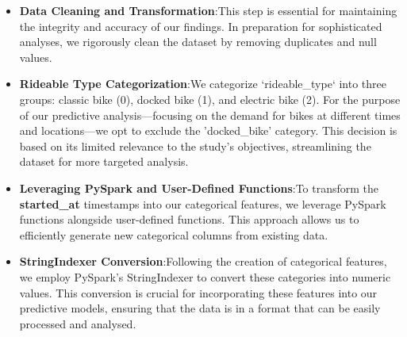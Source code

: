     \begin{itemize}
        \item \textbf{Data Cleaning and Transformation}:\newline This step is essential for maintaining the integrity and accuracy of our findings. In preparation for sophisticated analyses, we rigorously clean the dataset by removing duplicates and null values.
        \item \textbf{Rideable Type Categorization}:\newline We categorize `rideable\_type` into three groups: classic bike (0), docked bike (1), and electric bike (2).
                        For the purpose of our predictive analysis—focusing on the demand for bikes at different times and locations—we opt to exclude the 'docked\_bike' category.
                        This decision is based on its limited relevance to the study's objectives, streamlining the dataset for more targeted analysis.
        \item \textbf{Leveraging PySpark and User-Defined Functions}:\newline To transform the \textbf{started\_at} timestamps into our categorical features, we leverage PySpark functions alongside user-defined functions. This approach allows us to efficiently generate new categorical columns from existing data.
        \item \textbf{StringIndexer Conversion}:\newline Following the creation of categorical features, we employ PySpark's StringIndexer to convert these categories into numeric values. This conversion is crucial for incorporating these features into our predictive models, ensuring that the data is in a format that can be easily processed and analysed.
      \end{itemize}

